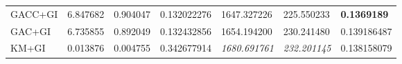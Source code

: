 \begin{table}[H]
\begin{tabular}{lllllll}
        GACC+GI    & 6.847682                                                            & 0.904047                                                              & 0.132022276                                                                        & 1647.327226          & 225.550233            & \textbf{0.1369189}                \\
        GAC+GI     & 6.735855                                                            & 0.892049                                                              & 0.132432856                                                                        & 1654.194200          & 230.241480            & 0.139186487                       \\
        KM+GI      & 0.013876                                                            & 0.004755                                                              & 0.342677914                                                                        & \textit{1680.691761} & \textit{232.201145}   & 0.138158079
    \end{tabular}
\end{table}
